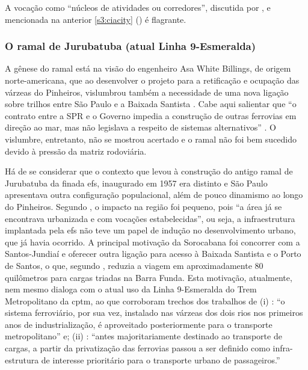 \documentclass[
article,			%
11pt,				%
oneside,			%
a4paper,			%
english,			%
brazil,				%
sumario=tradicional
]{abntex2}
\begin{document}
	A vocação como ``núcleos de atividades ou corredores'', discutida por , e mencionada na anterior \autoref{s3:ciacity} () é flagrante.
	
	\subsubsection{O ramal de Jurubatuba (atual Linha 9-Esmeralda)} \label{s3:linha9}
	
	A gênese do ramal está na visão do engenheiro Asa White Billings, de origem norte-americana, que ao desenvolver o projeto para a retificação e ocupação das várzeas do Pinheiros, vislumbrou também a necessidade de uma nova ligação sobre trilhos entre São Paulo e a Baixada Santista \cite[p. 61]{franco2005a}. Cabe aqui salientar que ``o contrato entre a SPR e o Governo impedia a construção de outras ferrovias em direção ao mar, mas não legislava a respeito de sistemas alternativos'' \cite[p. 61]{franco2005a}. O vislumbre, entretanto, não se mostrou acertado e o ramal não foi bem sucedido devido à pressão da matriz rodoviária.
	
	Há de se considerar que o contexto que levou à construção do antigo ramal de Jurubatuba da finada \glsdesc{efs}, inaugurado em 1957 \cite[p.140]{requena2016a} era distinto e São Paulo apresentava outra configuração populacional, além de pouco dinamismo ao longo do Pinheiros. Segundo , o impacto na região foi pequeno, pois ``a área já se encontrava urbanizada e com vocações estabelecidas'', ou seja, a infraestrutura implantada pela \gls{efs} não teve um papel de indução no desenvolvimento urbano, que já havia ocorrido. A principal motivação da Sorocabana foi concorrer com a Santos-Jundiaí e oferecer outra ligação para acesso à Baixada Santista e o Porto de Santos, o que, segundo , reduzia a viagem em aproximadamente 80 quilômetros para cargas triadas na Barra Funda. Esta motivação, atualmente, nem mesmo dialoga com o atual uso da Linha 9-Esmeralda do Trem Metropolitano da \gls{cptm}, ao que corroboram trechos dos trabalhos de (i) : ``o sistema ferroviário, por sua vez, instalado nas várzeas dos dois rios nos primeiros anos de industrialização, é aproveitado posteriormente para o transporte metropolitano'' e; (ii) : ``antes majoritariamente destinado ao transporte de cargas, a partir da privatização das ferrovias passou a ser definido como infra-estrutura de interesse prioritário para o transporte urbano de passageiros.'' 
	
\end{document}
